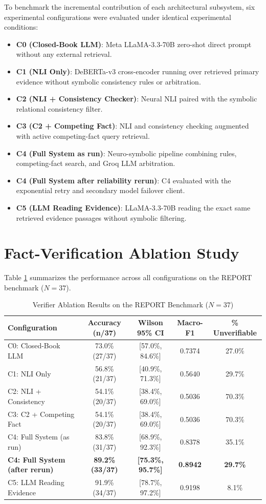 \documentclass[12pt,a4paper]{report}
\begin{document}
To benchmark the incremental contribution of each architectural subsystem, six experimental configurations were evaluated under identical experimental conditions:
\begin{itemize}
    \item \textbf{C0 (Closed-Book LLM)}: Meta LLaMA-3.3-70B zero-shot direct prompt without any external retrieval.
    \item \textbf{C1 (NLI Only)}: DeBERTa-v3 cross-encoder running over retrieved primary evidence without symbolic consistency rules or arbitration.
    \item \textbf{C2 (NLI + Consistency Checker)}: Neural NLI paired with the symbolic relational consistency filter.
    \item \textbf{C3 (C2 + Competing Fact)}: NLI and consistency checking augmented with active competing-fact query retrieval.
    \item \textbf{C4 (Full System as run)}: Neuro-symbolic pipeline combining rules, competing-fact search, and Groq LLM arbitration.
    \item \textbf{C4 (Full System after reliability rerun)}: C4 evaluated with the exponential retry and secondary model failover client.
    \item \textbf{C5 (LLM Reading Evidence)}: LLaMA-3.3-70B reading the exact same retrieved evidence passages without symbolic filtering.
\end{itemize}

\section{Fact-Verification Ablation Study}
Table \ref{tab:ablation_results} summarizes the performance across all configurations on the REPORT benchmark ($N = 37$).

\begin{table}[h!]
\centering
\caption{Verifier Ablation Results on the REPORT Benchmark ($N = 37$)}
\label{tab:ablation_results}
\begin{tabular}{|l|c|c|c|c|}
\hline
\textbf{Configuration} & \textbf{Accuracy (n/37)} & \textbf{Wilson 95\% CI} & \textbf{Macro-F1} & \textbf{\% Unverifiable} \\
\hline
C0: Closed-Book LLM & 73.0\% (27/37) & [57.0\%, 84.6\%] & 0.7374 & 27.0\% \\
C1: NLI Only & 56.8\% (21/37) & [40.9\%, 71.3\%] & 0.5640 & 29.7\% \\
C2: NLI + Consistency & 54.1\% (20/37) & [38.4\%, 69.0\%] & 0.5036 & 70.3\% \\
C3: C2 + Competing Fact & 54.1\% (20/37) & [38.4\%, 69.0\%] & 0.5036 & 70.3\% \\
C4: Full System (as run) & 83.8\% (31/37) & [68.9\%, 92.3\%] & 0.8378 & 35.1\% \\
\textbf{C4: Full System (after rerun)} & \textbf{89.2\% (33/37)} & \textbf{[75.3\%, 95.7\%]} & \textbf{0.8942} & \textbf{29.7\%} \\
C5: LLM Reading Evidence & 91.9\% (34/37) & [78.7\%, 97.2\%] & 0.9198 & 8.1\% \\
\hline
\end{tabular}
\end{table}
\end{document}
